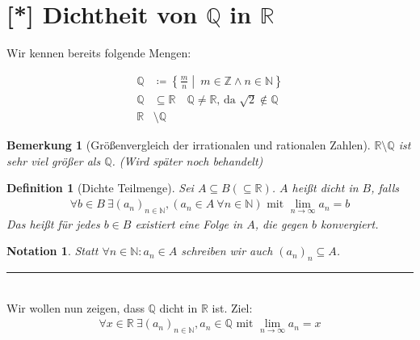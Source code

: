 \documentclass[11pt, twoside, a4paper]{article}
\theoremstyle{plain}
\newtheorem{bemerkung}[blockelement]{Bemerkung}
\newtheorem{definition}[blockelement]{Definition}
\newtheorem{notation}[blockelement]{Notation}
\newcommand{\set}[1]{\left\{#1\right\}}
\newcommand{\definedas}[0]{\coloneqq}
\newcommand{\exclude}[0]{\setminus}
\newcommand{\fromto}{\rightarrow{}}
\newcommand{\naturalnumbers}{\mathbb{N}}
\newcommand{\realnumbers}{\mathbb{R}}
\newcommand{\horizontalline}[0]{\par\noindent\rule{0.05\textwidth}{0.1pt}\\}
\begin{document}
    \newpage


    \section{[*] Dichtheit von $\mathbb{Q}$ in $\mathbb{R}$}

    Wir kennen bereits folgende Mengen:

    \begin{align*}
        \mathbb{Q}&\definedas\set{\frac{m}{n}\middle|~m\in\mathbb{Z} \land n\in\naturalnumbers}\tag{Rationale Zahlen}\\
        \mathbb{Q}&\subseteq \realnumbers\quad \mathbb{Q}\neq\mathbb{R}\text{, da } \sqrt{2}\notin \mathbb{Q}\\
        \mathbb{R}&\exclude\mathbb{Q} \tag{Irrationale Zahlen}
    \end{align*}

    \begin{bemerkung}[Größenvergleich der irrationalen und rationalen Zahlen]
        $\realnumbers\exclude\mathbb{Q}$ ist sehr viel größer als $\mathbb{Q}$. (Wird später noch behandelt)
    \end{bemerkung}

    \begin{definition}[Dichte Teilmenge] %
        Sei $A\subseteq B (\subseteq \realnumbers)$. $A$ heißt dicht in $B$, falls
        \begin{align*}
            \forall b\in B~\exists (a_n)_{n\in\naturalnumbers}, (a_n \in A~\forall n\in\naturalnumbers)\text{ mit }\lim_{n\fromto\infty} a_n = b
        \end{align*}
        Das heißt für jedes $b\in B$ existiert eine Folge in $A$, die gegen $b$ konvergiert.
    \end{definition}

    \begin{notation}
        Statt $\forall n\in\naturalnumbers\colon a_n \in A$ schreiben wir auch $(a_n)_n\subseteq A$.
    \end{notation}
    \horizontalline
    \noindent Wir wollen nun zeigen, dass $\mathbb{Q}$ dicht in $\realnumbers$ ist. Ziel:
    \begin{align*}
        \forall x\in\realnumbers~\exists (a_n)_{n\in\naturalnumbers}, a_n\in\mathbb{Q}\text{ mit }\lim_{n\fromto\infty} a_n =x
    \end{align*}
\end{document}
